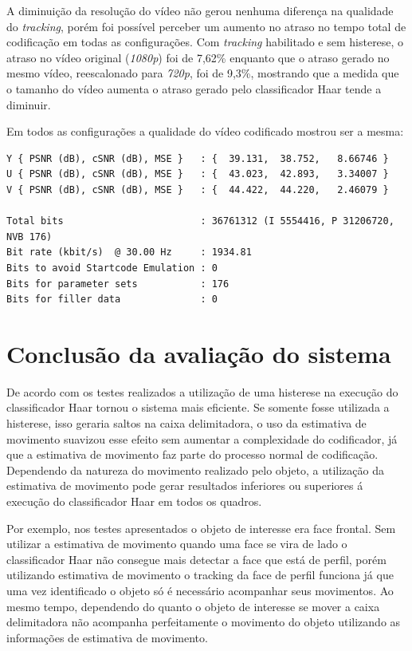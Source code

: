 A diminuição da resolução do vídeo não gerou nenhuma diferença na qualidade do \textit{tracking}, porém foi possível perceber um aumento no atraso no tempo total de codificação em todas as configurações. Com \textit{tracking} habilitado e sem histerese, o atraso no vídeo original (\textit{1080p}) foi de 7,62\% enquanto que o atraso gerado no mesmo vídeo, reescalonado para \textit{720p}, foi de 9,3\%, mostrando que a medida que o tamanho do vídeo aumenta o atraso gerado pelo classificador Haar tende a diminuir.


Em todos as configurações a qualidade do vídeo codificado mostrou ser a mesma:

\begin{lstlisting}
Y { PSNR (dB), cSNR (dB), MSE }   : {  39.131,  38.752,   8.66746 }
U { PSNR (dB), cSNR (dB), MSE }   : {  43.023,  42.893,   3.34007 }
V { PSNR (dB), cSNR (dB), MSE }   : {  44.422,  44.220,   2.46079 }

Total bits                        : 36761312 (I 5554416, P 31206720, NVB 176) 
Bit rate (kbit/s)  @ 30.00 Hz     : 1934.81
Bits to avoid Startcode Emulation : 0 
Bits for parameter sets           : 176 
Bits for filler data              : 0
\end{lstlisting}


\section{ Conclusão da avaliação do sistema }


De acordo com os testes realizados a utilização de uma histerese na execução do classificador Haar tornou o sistema mais eficiente. Se somente fosse utilizada a histerese, isso geraria saltos na caixa delimitadora, o uso da estimativa de movimento suavizou esse efeito sem aumentar a complexidade do codificador, já que a estimativa de movimento faz parte do processo normal de codificação. Dependendo da natureza do movimento realizado pelo objeto, a utilização da estimativa de movimento pode gerar resultados inferiores ou superiores á execução do classificador Haar em todos os quadros.

Por exemplo, nos testes apresentados o objeto de interesse era face frontal. Sem utilizar a estimativa de movimento quando uma face se vira de lado o classificador Haar não consegue mais detectar a face que está de perfil, porém utilizando estimativa de movimento o tracking da face de perfil funciona já que uma vez identificado o objeto só é necessário acompanhar seus movimentos. Ao mesmo tempo, dependendo do quanto o objeto de interesse se mover a caixa delimitadora não acompanha perfeitamente o movimento do objeto utilizando as informações de estimativa de movimento. 

